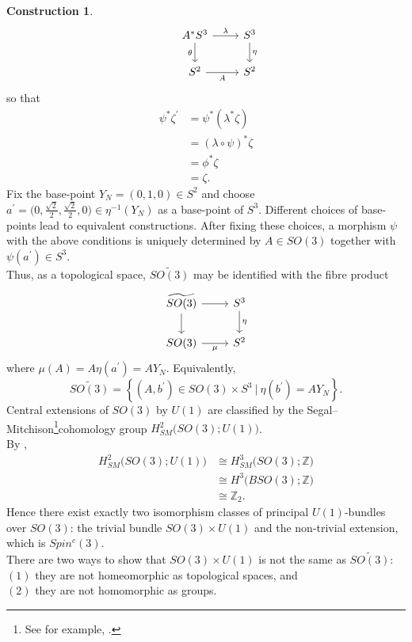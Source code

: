 \documentclass{article}
\theoremstyle{plain}
\theoremstyle{definition}
\newtheorem{const}[thm]{Construction}
\begin{document}
\begin{const}
\[\begin{tikzcd}
& A^\ast S^3 \arrow[r,"\lambda"] \arrow[d,"\theta"'] & S^3 \arrow[d,"\eta"] \\
& S^2 \arrow[r,"A"'] & S^2
\end{tikzcd}
\]
so that
\begin{align*}
\psi^\ast\zeta^\prime & = \psi^\ast\left(\lambda^\ast\zeta\right) \\
& = \left(\lambda \circ \psi\right)^\ast \zeta \\
& = \phi^\ast\zeta \\
& = \zeta.
\end{align*}
Fix the base-point $Y_N = (0,1,0) \in S^2$ and choose $a^\prime = \bigl(0,\tfrac{\sqrt{2}}{2},\tfrac{\sqrt{2}}{2},0\bigr) \in \eta^{-1}(Y_N)$ as a base-point of $S^3$. Different choices of base-points lead to equivalent constructions. After fixing these choices, a morphism $\psi$ with the above conditions is uniquely determined by $A \in SO(3)$ together with $\psi(a^\prime) \in S^3$. \\
Thus, as a topological space, $\widetilde{SO(3)}$ may be identified with the fibre product
\[
\begin{tikzcd}
\widetilde{SO(3)} \arrow[r] \arrow[d] & S^3 \arrow[d,"\eta"] \\
SO(3) \arrow[r,"\mu"'] & S^2
\end{tikzcd}
\]
where $\mu(A) = A\eta(a^\prime) = AY_N$. Equivalently,
\[
\widetilde{SO(3)} = \left\{(A,b^\prime) \in SO(3) \times S^3 ~ \big\vert ~ \eta(b^\prime)=AY_N\right\}.
\]
Central extensions of $SO(3)$ by $U(1)$ are classified by the Segal–Mitchison\footnote{See for example, \cite[Section 4]{MR2800361}.}cohomology group $H^2_{SM}\bigl(SO(3);U(1)\bigr)$. \\
By \cite[Corollary 97]{MR2800361},
\begin{align*}
H^2_{SM}\bigl(SO(3);U(1)\bigr) & \cong H^3_{SM}\bigl(SO(3);\mathbb{Z}\bigr) \\
&\cong H^3\bigl(BSO(3);\mathbb{Z}\bigr) \\
& \cong \mathbb{Z}_2.
\end{align*}
Hence there exist exactly two isomorphism classes of principal $U(1)$-bundles over $SO(3)$: the trivial bundle $SO(3)\times U(1)$ and the non-trivial extension, which is $Spin^c(3)$. \\
There are two ways to show that $SO(3)\times U(1)$ is not the same as $\widetilde{SO(3)}$: \\
$(1)$ they are not homeomorphic as topological spaces, and \\
$(2)$ they are not homomorphic as groups. \\

\end{const}
\end{document}
